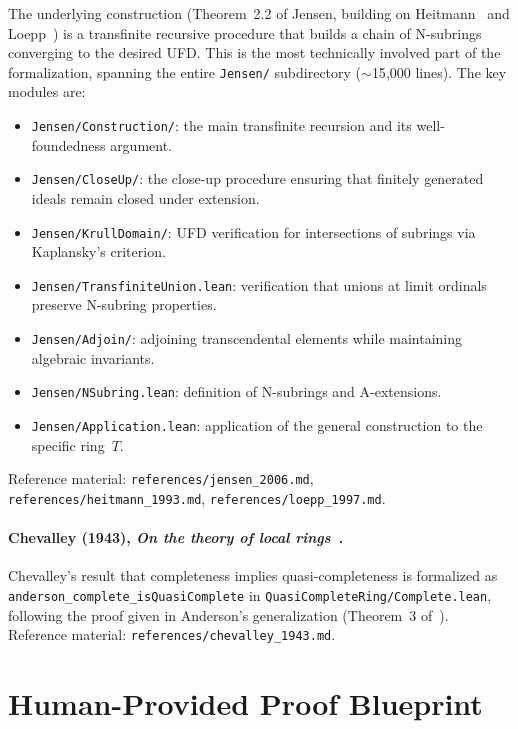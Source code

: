 \documentclass[]{pkuai4m}
\theoremstyle{plain}
\theoremstyle{definition}
\begin{document}
The underlying construction (Theorem~2.2 of Jensen, building on Heitmann~\cite{heitmann1993characterization} and Loepp~\cite{loepp1997constructing}) is a transfinite recursive procedure that builds a chain of N-subrings converging to the desired UFD. This is the most technically involved part of the formalization, spanning the entire \texttt{Jensen/} subdirectory ($\sim$15{,}000 lines). The key modules are:
\begin{itemize}
\item \texttt{Jensen/Construction/}: the main transfinite recursion and its well-foundedness argument.
\item \texttt{Jensen/CloseUp/}: the close-up procedure ensuring that finitely generated ideals remain closed under extension.
\item \texttt{Jensen/KrullDomain/}: UFD verification for intersections of subrings via Kaplansky's criterion.
\item \texttt{Jensen/TransfiniteUnion.lean}: verification that unions at limit ordinals preserve N-subring properties.
\item \texttt{Jensen/Adjoin/}: adjoining transcendental elements while maintaining algebraic invariants.
\item \texttt{Jensen/NSubring.lean}: definition of N-subrings and A-extensions.
\item \texttt{Jensen/Application.lean}: application of the general construction to the specific ring~$T$.
\end{itemize}
Reference material: \texttt{references/jensen\_2006.md}, \texttt{references/heitmann\_1993.md}, \texttt{references/loepp\_1997.md}.

\paragraph{Chevalley (1943), \emph{On the theory of local rings}~\cite{chevalley1943theory}.}

Chevalley's result that completeness implies quasi-completeness is formalized as \texttt{anderson\_complete\_isQuasiComplete} in \texttt{QuasiCompleteRing/Complete.lean}, following the proof given in Anderson's generalization (Theorem~3 of~\cite{anderson2014quasi}).\\
Reference material: \texttt{references/chevalley\_1943.md}.

\section{Human-Provided Proof Blueprint}\label{appendix:human-blueprint}
\end{document}
